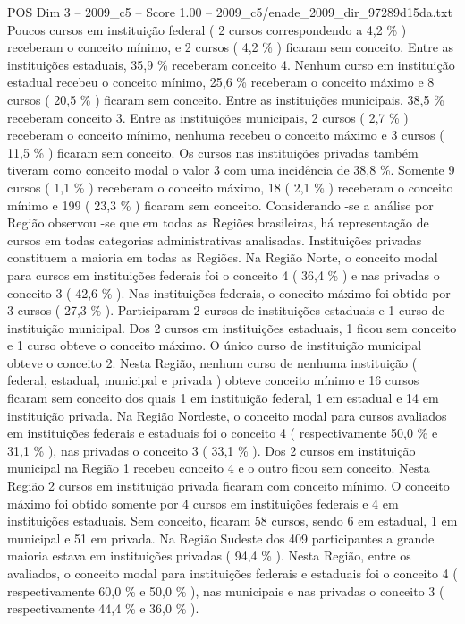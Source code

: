\begin{textsample}{POS Dim 3 – 2009\_c5 – Score 1.00 – 2009\_c5/enade\_2009\_dir\_97289d15da.txt}
Poucos cursos em instituição federal ( 2 cursos correspondendo a 4,2 \% ) receberam o conceito mínimo, e 2 cursos ( 4,2 \% ) ficaram sem conceito.
Entre as instituições estaduais, 35,9 \% receberam conceito 4.
Nenhum curso em instituição estadual recebeu o conceito mínimo, 25,6 \% receberam o conceito máximo e 8 cursos ( 20,5 \% ) ficaram sem conceito.
Entre as instituições municipais, 38,5 \% receberam conceito 3.
Entre as instituições municipais, 2 cursos ( 2,7 \% ) receberam o conceito mínimo, nenhuma recebeu o conceito máximo e 3 cursos ( 11,5 \% ) ficaram sem conceito.
Os cursos nas instituições privadas também tiveram como conceito modal o valor 3 com uma incidência de 38,8 \%.
Somente 9 cursos ( 1,1 \% ) receberam o conceito máximo, 18 ( 2,1 \% ) receberam o conceito mínimo e 199 ( 23,3 \% ) ficaram sem conceito.
Considerando -se a análise por Região observou -se que em todas as Regiões brasileiras, há representação de cursos em todas categorias administrativas analisadas.
Instituições privadas constituem a maioria em todas as Regiões.
Na Região Norte, o conceito modal para cursos em instituições federais foi o conceito 4 ( 36,4 \% ) e nas privadas o conceito 3 ( 42,6 \% ).
Nas instituições federais, o conceito máximo foi obtido por 3 cursos ( 27,3 \% ).
Participaram 2 cursos de instituições estaduais e 1 curso de instituição municipal.
Dos 2 cursos em instituições estaduais, 1 ficou sem conceito e 1 curso obteve o conceito máximo.
O único curso de instituição municipal obteve o conceito 2.
Nesta Região, nenhum curso de nenhuma instituição ( federal, estadual, municipal e privada ) obteve conceito mínimo e 16 cursos ficaram sem conceito dos quais 1 em instituição federal, 1 em estadual e 14 em instituição privada.
Na Região Nordeste, o conceito modal para cursos avaliados em instituições federais e estaduais foi o conceito 4 ( respectivamente 50,0 \% e 31,1 \% ), nas privadas o conceito 3 ( 33,1 \% ).
Dos 2 cursos em instituição municipal na Região 1 recebeu conceito 4 e o outro ficou sem conceito.
Nesta Região 2 cursos em instituição privada ficaram com conceito mínimo.
O conceito máximo foi obtido somente por 4 cursos em instituições federais e 4 em instituições estaduais.
Sem conceito, ficaram 58 cursos, sendo 6 em estadual, 1 em municipal e 51 em privada.
Na Região Sudeste dos 409 participantes a grande maioria estava em instituições privadas ( 94,4 \% ).
Nesta Região, entre os avaliados, o conceito modal para instituições federais e estaduais foi o conceito 4 ( respectivamente 60,0 \% e 50,0 \% ), nas municipais e nas privadas o conceito 3 ( respectivamente 44,4 \% e 36,0 \% ).

\end{textsample}
